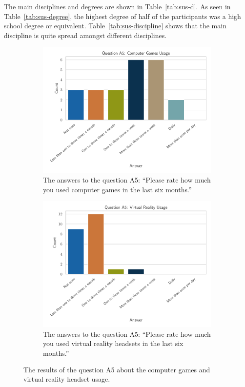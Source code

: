 The main disciplines and degrees are shown in Table~\ref{tab:sus-d}. As seen in Table~\ref{tab:sus-degree}, the highest degree of half of the participants was a high school degree or equivalent. Table~\ref{tab:sus-discipline} shows that the main discipline is quite spread amongst different disciplines.

\begin{figure}[H]
  \centering
  \begin{subfigure}{.48\textwidth}%
    \centering
    \includegraphics[width=\textwidth]{figures/evaluation/res_demo_q8_s3.pdf}
    \caption{The answers to the question A5: \enquote{Please rate how much you used computer games in the last six months.}}\label{fig:res-demo-q8-s3}
  \end{subfigure}%
  \hspace{0.03\textwidth}
  \begin{subfigure}{.48\textwidth}%
    \centering
    \includegraphics[width=\textwidth]{figures/evaluation/res_demo_q8_s4.pdf}
    \caption{The answers to the question A5: \enquote{Please rate how much you used virtual reality headsets in the last six months.}}\label{fig:res-demo-q8-s4}
  \end{subfigure}%
  \caption[Computer games and virtual reality headset usage]{The results of the question A5 about the computer games and virtual reality headset usage.}\label{fig:res-demo-q8}
\end{figure}

